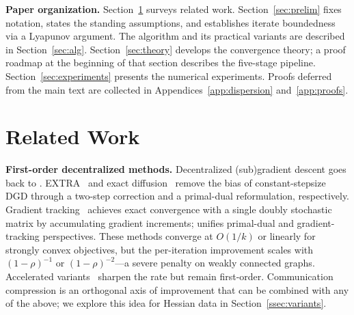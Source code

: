 \documentclass[11pt,a4paper]{article}
\def\cO{O}%
\newcommand{\cO}{\mathcal{O}}
\begin{document}
\smallskip
\noindent\textbf{Paper organization.}
Section~\ref{sec:related} surveys related work.
Section~\ref{sec:prelim} fixes notation, states the standing
assumptions, and establishes iterate boundedness via a Lyapunov
argument.
The algorithm and its practical variants are described in
Section~\ref{sec:alg}.
Section~\ref{sec:theory} develops the convergence theory; a proof
roadmap at the beginning of that section describes the five-stage
pipeline.
Section~\ref{sec:experiments} presents the numerical experiments.
Proofs deferred from the main text are collected in
Appendices~\ref{app:dispersion} and~\ref{app:proofs}.

	\section{Related Work}\label{sec:related}
	
	\noindent\textbf{First-order decentralized methods.}
	Decentralized (sub)gradient descent goes back to
	\citet{nedic2009subgradient}.
	EXTRA~\citep{shi2015extra} and exact
	diffusion~\citep{yuan2019exactdiffusion} remove the bias of
	constant-stepsize DGD through a two-step correction and a
	primal-dual reformulation, respectively.
	Gradient tracking~\citep{nedic2017diging,xin2019distributed,pu2021distributed}
	achieves exact convergence with a single doubly stochastic matrix by
	accumulating gradient increments;
	\citet{alghunaim2020decentralized} unifies primal-dual and
	gradient-tracking perspectives.
	These methods converge at $\cO(1/k)$ or linearly for strongly
	convex objectives, but the per-iteration improvement scales
	with $(1{-}\rho)^{-1}$ or $(1{-}\rho)^{-2}$---a severe
	penalty on weakly connected graphs.
	Accelerated variants~\citep{jakovetic2014fast,li2021decentralized}
	sharpen the rate but remain first-order.
	Communication compression
	\citep{koloskova2019decentralized,beznosikov2023biased}
	is an orthogonal axis of improvement that can be combined with
	any of the above; we explore this idea for Hessian data in
	Section~\ref{ssec:variants}.
	
\end{document}
